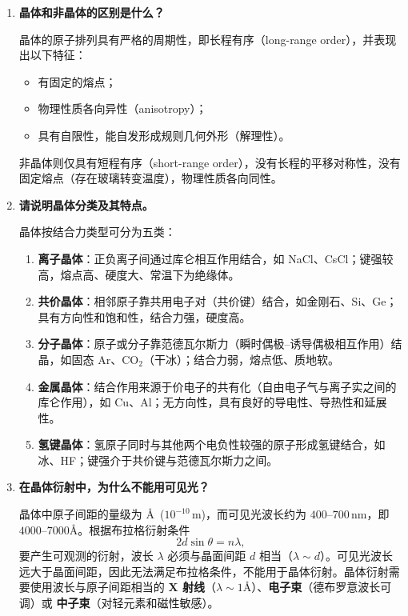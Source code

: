 \begin{enumerate}[label=\textbf{\arabic*.}, leftmargin=2em, itemsep=0.8em]

\item \textbf{晶体和非晶体的区别是什么？}

晶体的原子排列具有严格的周期性，即长程有序（long-range order），并表现出以下特征：
\begin{itemize}[nosep]
    \item 有固定的熔点；
    \item 物理性质各向异性（anisotropy）；
    \item 具有自限性，能自发形成规则几何外形（解理性）。
\end{itemize}
非晶体则仅具有短程有序（short-range order），没有长程的平移对称性，没有固定熔点（存在玻璃转变温度），物理性质各向同性。

\item \textbf{请说明晶体分类及其特点。}

晶体按结合力类型可分为五类：
\begin{enumerate}[nosep, label=(\arabic*)]
    \item \textbf{离子晶体}：正负离子间通过库仑相互作用结合，如 NaCl、CsCl；键强较高，熔点高、硬度大、常温下为绝缘体。
    \item \textbf{共价晶体}：相邻原子靠共用电子对（共价键）结合，如金刚石、Si、Ge；具有方向性和饱和性，结合力强，硬度高。
    \item \textbf{分子晶体}：原子或分子靠范德瓦尔斯力（瞬时偶极--诱导偶极相互作用）结晶，如固态 Ar、CO$_2$（干冰）；结合力弱，熔点低、质地软。
    \item \textbf{金属晶体}：结合作用来源于价电子的共有化（自由电子气与离子实之间的库仑作用），如 Cu、Al；无方向性，具有良好的导电性、导热性和延展性。
    \item \textbf{氢键晶体}：氢原子同时与其他两个电负性较强的原子形成氢键结合，如冰、HF；键强介于共价键与范德瓦尔斯力之间。
\end{enumerate}

\item \textbf{在晶体衍射中，为什么不能用可见光？}

晶体中原子间距的量级为 \AA\ ($10^{-10}\,$m)，而可见光波长约为 $400$--$700\,$nm，即 $4000$--$7000$\AA。根据布拉格衍射条件
\[
    2d\sin\theta = n\lambda,
\]
要产生可观测的衍射，波长 $\lambda$ 必须与晶面间距 $d$ 相当（$\lambda\sim d$）。可见光波长远大于晶面间距，因此无法满足布拉格条件，不能用于晶体衍射。晶体衍射需要使用波长与原子间距相当的 \textbf{X 射线}（$\lambda\sim 1$\AA）、\textbf{电子束}（德布罗意波长可调）或 \textbf{中子束}（对轻元素和磁性敏感）。


\end{enumerate}
